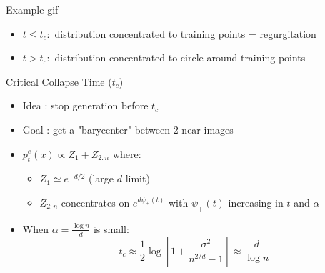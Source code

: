 \documentclass[aspectratio=169]{beamer}
\begin{document}
\begin{frame}{Example gif}
    \begin{itemize}
    \end{itemize}
    \begin{center}
    \end{center}
    \begin{itemize}
        \item $t \leq t_c :$ distribution concentrated to training points = regurgitation
        \item $t > t_c :$ distribution concentrated to circle around training points
    \end{itemize}
\end{frame}


\begin{frame}{Critical Collapse Time ($t_c$)}
    \begin{itemize}
        \item Idea : stop generation before $t_c$
        \item Goal : get a "barycenter" between 2 near images
        \item $p_t^e(x) \propto Z_1 + Z_{2:n}$ where:
        \begin{itemize}
            \item $Z_1 \simeq e^{-d/2}$ (large $d$ limit)
            \item $Z_{2:n}$ concentrates on $e^{d\psi_+(t)}$ with $\psi_+(t)$ increasing in $t$ and $\alpha$
        \end{itemize}
        \item When $\alpha = \frac{\log n}{d}$ is small:
        \begin{equation}
            t_c \approx \frac{1}{2}\log\left[1+\frac{\sigma^2}{n^{2/d}-1}\right] \approx \frac{d}{\log n}
        \end{equation}
    \end{itemize}
    
    \begin{center}
    \end{center}
\end{frame}
\end{document}

